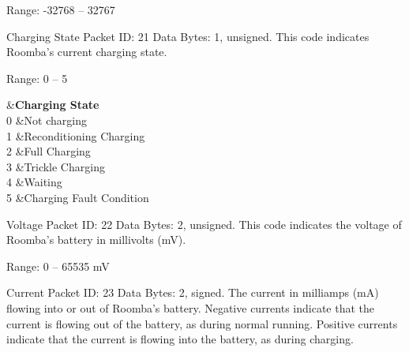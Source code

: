 \begin{Desc}
\begin{description}
Range\+: -\/32768 – 32767 \item[{\em 
\hypertarget{group__roomba-lib_gga46f008b5055c4a08d3123c6a3478373eaf2eae234a42573cc6afcd3a96f4022fa}{}R\+O\+O\+M\+B\+A\+\_\+\+C\+H\+A\+R\+G\+I\+N\+G\+\_\+\+S\+T\+A\+T\+E\label{group__roomba-lib_gga46f008b5055c4a08d3123c6a3478373eaf2eae234a42573cc6afcd3a96f4022fa}
}]Charging State Packet I\+D\+: 21 Data Bytes\+: 1, unsigned. This code indicates Roomba’s current charging state.

Range\+: 0 – 5

\begin{TabularC}{2}
\hline
{}&{\bf Charging State  }\\
0 &Not charging \\
1 &Reconditioning Charging \\
2 &Full Charging \\
3 &Trickle Charging \\
4 &Waiting \\
5 &Charging Fault Condition \\
\end{TabularC}
\item[{\em 
\hypertarget{group__roomba-lib_gga46f008b5055c4a08d3123c6a3478373ea6e2211c35c4d928b8a7b17ccb9315250}{}R\+O\+O\+M\+B\+A\+\_\+\+V\+O\+L\+T\+A\+G\+E\label{group__roomba-lib_gga46f008b5055c4a08d3123c6a3478373ea6e2211c35c4d928b8a7b17ccb9315250}
}]Voltage Packet I\+D\+: 22 Data Bytes\+: 2, unsigned. This code indicates the voltage of Roomba’s battery in millivolts (m\+V).

Range\+: 0 – 65535 m\+V \item[{\em 
\hypertarget{group__roomba-lib_gga46f008b5055c4a08d3123c6a3478373ea4d65c164218b7190fca61c69e8f60f93}{}R\+O\+O\+M\+B\+A\+\_\+\+C\+U\+R\+R\+E\+N\+T\label{group__roomba-lib_gga46f008b5055c4a08d3123c6a3478373ea4d65c164218b7190fca61c69e8f60f93}
}]Current Packet I\+D\+: 23 Data Bytes\+: 2, signed. The current in milliamps (m\+A) flowing into or out of Roomba’s battery. Negative currents indicate that the current is flowing out of the battery, as during normal running. Positive currents indicate that the current is flowing into the battery, as during charging.


\end{description}
\end{Desc}
